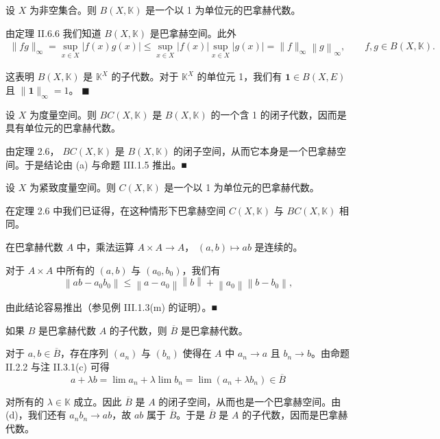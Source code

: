 \begin{example}

\begin{items}
\item

设 $X$ 为非空集合。则 $B(X,\mathbb{K})$ 是一个以 1 为单位元的巴拿赫代数。

\proofhead
由定理 II.6.6 我们知道  $ B(X,\mathbb{K}) $ 是巴拿赫空间。此外
\begin{equation*}
\begin{array}{r}{\|f g\|_{\infty}=\underset{x\in X}{\operatorname*{s u p}}|f(x)g(x)|\leq\underset{x\in X}{\operatorname*{s u p}}|f(x)|\underset{x\in X}{\operatorname*{s u p}}|g(x)|=\|f\|_{\infty}\left\|g\right\|_{\infty},\qquad f,g\in B(X,\mathbb{K}).}\end{array}
\end{equation*}

这表明  $ B(X, \mathbb{K}) $ 是  $ \mathbb{K}^X $ 的子代数。对于  $ \mathbb{K}^X $ 的单位元 1，我们有  $ \mathbf{1} \in B(X, E) $ 且  $ \|\mathbf{1}\|_{\infty} = 1 $。 $ \blacksquare $

\item

设 $X$ 为度量空间。则 $BC(X, \mathbb{K})$ 是 $B(X, \mathbb{K})$ 的一个含 1 的闭子代数，因而是具有单位元的巴拿赫代数。

\proofhead
由定理 2.6， $ BC(X, \mathbb{K}) $ 是  $ B(X, \mathbb{K}) $ 的闭子空间，从而它本身是一个巴拿赫空间。于是结论由 (a) 与命题 III.1.5 推出。■
\item

设 $X$ 为紧致度量空间。则 $C(X,\mathbb{K})$ 是一个以 1 为单位元的巴拿赫代数。

\proofhead
在定理 2.6 中我们已证得，在这种情形下巴拿赫空间  $ C(X, \mathbb{K}) $ 与  $ BC(X, \mathbb{K}) $ 相同。
\item

在巴拿赫代数  $ A $ 中，乘法运算  $ A \times A \to A $， $ (a, b) \mapsto ab $ 是连续的。

\proofhead
对于  $ A\times A $ 中所有的  $ (a,b) $ 与  $ (a_{0},b_{0}) $，我们有
\[
\left\|a b-a_{0}b_{0}\right\|\leq\left\|a-a_{0}\right\|\left\|b\right\|+\left\|a_{0}\right\|\left\|b-b_{0}\right\|,
\]

由此结论容易推出（参见例 III.1.3(m) 的证明）。■

\item

如果 $B$ 是巴拿赫代数 $A$ 的子代数，则 $\overline{B}$ 是巴拿赫代数。

\proofhead
对于 $a, b \in \overline{B}$，存在序列 $(a_n)$ 与 $(b_n)$ 使得在 $A$ 中 $a_n \to a$ 且 $b_n \to b$。由命题 II.2.2 与注 II.3.1(c) 可得
\[
a+\lambda b=\lim a_{n}+\lambda\lim b_{n}=\lim(a_{n}+\lambda b_{n})\in\overline{B}
\]

对所有的 $\lambda \in \mathbb{K}$ 成立。因此 $\overline{B}$ 是 $A$ 的闭子空间，从而也是一个巴拿赫空间。由 (d)，我们还有 $a_n b_n \to ab$，故 $ab$ 属于 $\overline{B}$。于是 $\overline{B}$ 是 $A$ 的子代数，因而是巴拿赫代数。

\end{items}

\end{example}

